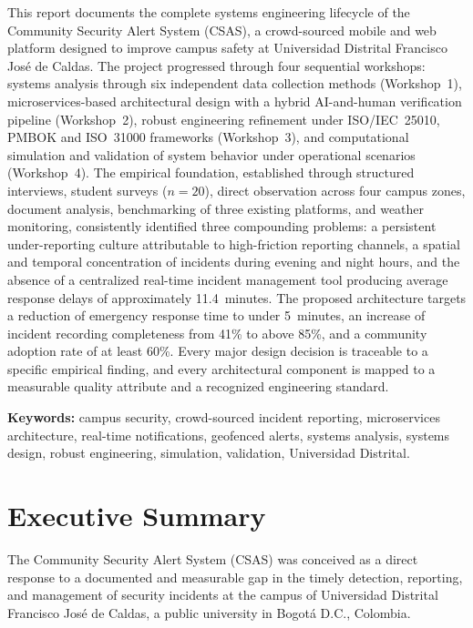 \documentclass[11pt,a4paper]{article}
\begin{document}
This report documents the complete systems engineering lifecycle of the Community Security Alert System (CSAS), a crowd-sourced mobile and web platform designed to improve campus safety at Universidad Distrital Francisco Jos\'e de Caldas. The project progressed through four sequential workshops: systems analysis through six independent data collection methods (Workshop~1), microservices-based architectural design with a hybrid AI-and-human verification pipeline (Workshop~2), robust engineering refinement under ISO/IEC~25010, PMBOK and ISO~31000 frameworks (Workshop~3), and computational simulation and validation of system behavior under operational scenarios (Workshop~4). The empirical foundation, established through structured interviews, student surveys ($n=20$), direct observation across four campus zones, document analysis, benchmarking of three existing platforms, and weather monitoring, consistently identified three compounding problems: a persistent under-reporting culture attributable to high-friction reporting channels, a spatial and temporal concentration of incidents during evening and night hours, and the absence of a centralized real-time incident management tool producing average response delays of approximately 11.4~minutes. The proposed architecture targets a reduction of emergency response time to under 5~minutes, an increase of incident recording completeness from 41\% to above 85\%, and a community adoption rate of at least 60\%. Every major design decision is traceable to a specific empirical finding, and every architectural component is mapped to a measurable quality attribute and a recognized engineering standard.

\vspace{0.3cm}
\noindent\textbf{Keywords:} campus security, crowd-sourced incident reporting, microservices architecture, real-time notifications, geofenced alerts, systems analysis, systems design, robust engineering, simulation, validation, Universidad Distrital.

\newpage
\tableofcontents
\newpage

\section{Executive Summary}

The Community Security Alert System (CSAS) was conceived as a direct response to a documented and measurable gap in the timely detection, reporting, and management of security incidents at the campus of Universidad Distrital Francisco Jos\'e de Caldas, a public university in Bogot\'a D.C., Colombia.
\end{document}
